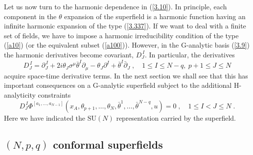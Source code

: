 \documentclass[a4paper,12pt]{article}
\begin{document}
Let us now turn to the harmonic dependence in (\ref{3.10}). In 
principle, each component in the $\theta$ expansion of the 
superfield is a harmonic function having an infinite harmonic 
expansion of the type (\ref{3.337}). If we want to deal with a 
finite set of fields, we have to impose a harmonic irreducibility 
condition of the type (\ref{a10}) (or the equivalent subset 
(\ref{a100})). However, in the G-analytic basis (\ref{3.9}) the 
harmonic derivatives become covariant, $D^{\,I}_J$. In particular, 
the derivatives 
\begin{equation}\label{sptn}
  D^{\,I}_{J}= \partial^{\,I}_{J} +2 i\theta_{J}\sigma^\mu 
\bar\theta^{I}\partial_\mu - \theta_J\partial^I + 
\bar\theta^I\bar\partial_J\;, \quad 1\leq I\leq N-q, \ p+1\leq 
J\leq N 
\end{equation}
acquire space-time derivative terms. In the next section we shall 
see that this has important consequences on a G-analytic 
superfield subject to the additional H-analyticity constraints 
\begin{equation}\label{3.11}
  D^{\,I}_{J}\Phi^{[a_1,\ldots,a_{N-1}]}(x_A,\theta_{p+1},\ldots,\theta_{N},
\bar\theta^1,\ldots,\bar\theta^{N-q}, u) = 0\;, \quad 1\leq I < J 
\leq N\;. 
\end{equation}
Here we have indicated the $\mbox{SU}(N)$ representation carried 
by the superfield. 

\subsection{$(N,p,q)$ conformal superfields}\label{npqconf}
\end{document}

